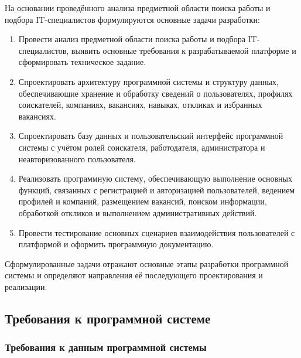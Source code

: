 На основании проведённого анализа предметной области поиска работы и подбора IT-специалистов формулируются основные задачи разработки:
\begin{enumerate}
	\item Провести анализ предметной области поиска работы и подбора IT-специалистов, выявить основные требования к разрабатываемой платформе и сформировать техническое задание.
	\item Спроектировать архитектуру программной системы и структуру данных, обеспечивающие хранение и обработку сведений о пользователях, профилях соискателей, компаниях, вакансиях, навыках, откликах и избранных вакансиях.
	\item Спроектировать базу данных и пользовательский интерфейс программной системы с учётом ролей соискателя, работодателя, администратора и неавторизованного пользователя.
	\item Реализовать программную систему, обеспечивающую выполнение основных функций, связанных с регистрацией и авторизацией пользователей, ведением профилей и компаний, размещением вакансий, поиском информации, обработкой откликов и выполнением административных действий.
	\item Провести тестирование основных сценариев взаимодействия пользователей с платформой и оформить программную документацию.
\end{enumerate}

Сформулированные задачи отражают основные этапы разработки программной системы и определяют направления её последующего проектирования и реализации.

\subsection{Требования к программной системе}

\subsubsection{Требования к данным программной системы}

